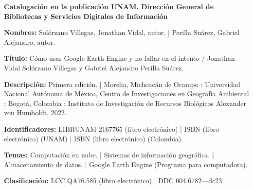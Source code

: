 \documentclass[
  12pt,
  letterpaper,
  twoside]{book}
\begin{document}
\newpage

\vspace*{\fill}
\begin{center}
    \begin{blackbox}
        {\footnotesize \textbf{Catalogación en la publicación UNAM. Dirección General de Bibliotecas y Servicios Digitales de Información}

            \textbf{Nombres:} Solórzano Villegas, Jonathan Vidal, autor. | Perilla Suárez, Gabriel Alejandro, autor.  

            \textbf{Título:} Cómo usar Google Earth Engine y no fallar en el intento / Jonathan Vidal Solórzano Villegas y Gabriel Alejandro Perilla Suárez.

            \textbf{Descripción:} Primera edición. | Morelia, Michoacán de Ocampo : Universidad Nacional Autónoma de México, Centro de Investigaciones en Geografía Ambiental ; Bogotá, Colombia : Instituto de Investigación de Recursos Biológicos Alexander von Humboldt, 2022.  
            
            \textbf{Identificadores:} LIBRUNAM 2167765 (libro electrónico) | ISBN (libro electrónico) (UNAM) | ISBN (libro electrónico) (Colombia).    
            
            \textbf{Temas:} Computación en nube. | Sistemas de información geográfica. | Almacenamiento de datos. | Google Earth Engine (Programa para computadora). 
            
            \textbf{Clasificación:} LCC QA76.585 (libro electrónico) | DDC 004.6782—dc23}
        
    \end{blackbox}
%
%            
%
%
%
%
%        
\end{center}
\end{document}
